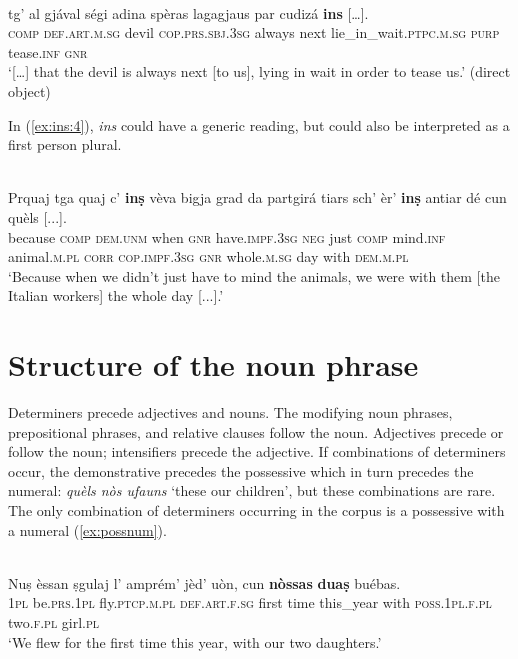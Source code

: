 \ea
\label{ex:ins:3}
\\
\gll  […] tg’ al gjával ségi adina spèras lagagjaus par cudizá \textbf{ins} […].\\
{}  \textsc{comp} \textsc{def.art.m.sg} devil \textsc{cop.prs.sbj.3sg} always next lie\_in\_wait.\textsc{ptpc.m.sg} \textsc{purp} tease.\textsc{inf} \textsc{gnr}\\
\glt `[…] that the devil is always next [to us], lying in wait in order to tease us.' (direct object)
\z

In (\ref{ex:ins:4}), \textit{ins} could have a generic reading, but could also be interpreted as a first person plural.

\ea
\label{ex:ins:4}
\\ 
\gll  Prquaj tga quaj c’ \textbf{inṣ} vèva bigja grad da partgirá tiars sch’ èr’ \textbf{inṣ} antiar dé cun quèls [...].  \\
because \textsc{comp} \textsc{dem.unm} when \textsc{gnr} have.\textsc{impf.3sg}  \textsc{neg} just \textsc{comp} mind.\textsc{inf} animal.\textsc{m.pl} \textsc{corr} \textsc{cop.impf.3sg} \textsc{gnr} whole.\textsc{m.sg} day with \textsc{dem.m.pl}\\
\glt `Because when we didn’t just have to mind the animals, we were with them [the Italian workers] the whole day [...].'
\z

\section{Structure of the noun phrase}
Determiners precede adjectives and nouns. The modifying noun phrases, prepositional phrases, and relative clauses follow the noun. Adjectives precede or follow the noun; intensifiers precede the adjective. If combinations of determiners occur, the demonstrative precedes the possessive which in turn precedes the numeral: \textit{quèls nòs ufauns} `these our children', but these combinations are rare. The only combination of determiners occurring in the corpus is a possessive with a numeral (\ref{ex:possnum}).

\ea
\label{ex:possnum}
\\ 
	\gll  Nuṣ èssan ṣgulaj l’ amprém’ jèd’ uòn, cun \textbf{nòssas} \textbf{duaṣ} buébas.\\
\textsc{1pl} be.\textsc{prs.1pl} fly.\textsc{ptcp.m.pl} \textsc{def.art.f.sg} first time this\_year with \textsc{poss.1pl.f.pl} two.\textsc{f.pl} girl.\textsc{pl}\\
\glt `We flew for the first time this year, with our two daughters.'
\z


